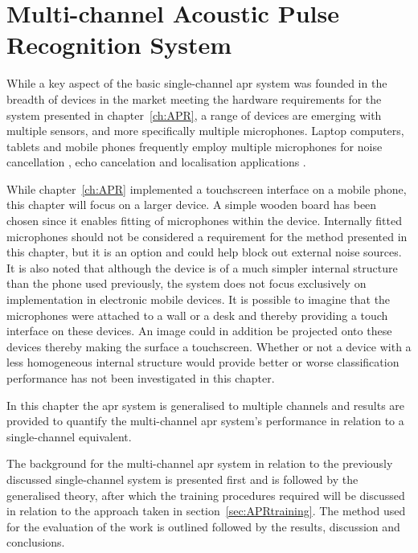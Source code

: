 \chapter{Multi-channel Acoustic Pulse Recognition System}\label{ch:MultichannelAPR}

\ifpdf
    \graphicspath{{Chapter4_MultiAPR/Chapter4Figs/PNG/}{Chapter4_MultiAPR/Chapter4Figs/PDF/}{Chapter4_MultiAPR/Chapter4Figs/}{Chapter4_MultiAPR/Chapter4Figs/Training/}}
\else
    \graphicspath{{Chapter4_MultiAPR/Chapter4Figs/EPS/}{Chapter4_MultiAPR/Chapter4Figs/}}
\fi

While a key aspect of the basic single-channel \gls{apr} system was founded in the breadth of devices in the market meeting the hardware requirements for the system presented in chapter~\ref{ch:APR}, a range of devices are emerging with multiple sensors, and more specifically multiple microphones. Laptop computers, tablets and mobile phones frequently employ multiple microphones for noise cancellation \cite{Habets2013}\cite{Habets2012}, echo cancelation \cite{US7925007} and localisation applications \cite{US8174547}\linebreak[2]\cite{US8233353}.

While chapter~\ref{ch:APR} implemented a touchscreen interface on a mobile phone, this chapter will focus on a larger device. A simple wooden board has been chosen since it enables fitting of microphones within the device. Internally fitted microphones should not be considered a requirement for the method presented in this chapter, but it is an option and could help block out external noise sources. It is also noted that although the device is of a much simpler internal structure than the phone used previously, the system does not focus exclusively on implementation in electronic mobile devices. It is possible to imagine that the microphones were attached to a wall or a desk and thereby providing a touch interface on these devices. An image could in addition be projected onto these devices thereby making the surface a touchscreen. Whether or not a device with a less homogeneous internal structure would provide better or worse classification performance has not been investigated in this chapter.

In this chapter the \gls{apr} system is generalised to multiple channels and results are provided to quantify the multi-channel \gls{apr} system's performance in relation to a single-channel equivalent.

The background for the multi-channel \gls{apr} system in relation to the previously discussed single-channel system is presented first and is followed by the generalised theory, after which the training procedures required will be discussed in relation to the approach taken in section~\ref{sec:APRtraining}. The method used for the evaluation of the work is outlined followed by the results, discussion and conclusions.

